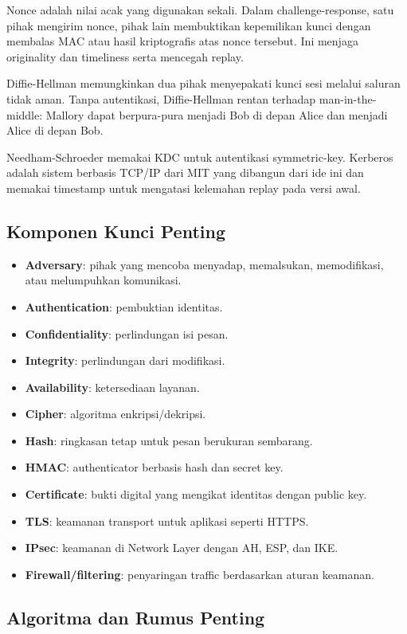 Nonce adalah nilai acak yang digunakan sekali. Dalam challenge-response, satu pihak mengirim nonce, pihak lain membuktikan kepemilikan kunci dengan membalas MAC atau hasil kriptografis atas nonce tersebut. Ini menjaga originality dan timeliness serta mencegah replay.

Diffie-Hellman memungkinkan dua pihak menyepakati kunci sesi melalui saluran tidak aman. Tanpa autentikasi, Diffie-Hellman rentan terhadap man-in-the-middle: Mallory dapat berpura-pura menjadi Bob di depan Alice dan menjadi Alice di depan Bob.

Needham-Schroeder memakai KDC untuk autentikasi symmetric-key. Kerberos adalah sistem berbasis TCP/IP dari MIT yang dibangun dari ide ini dan memakai timestamp untuk mengatasi kelemahan replay pada versi awal.

\subsection{Komponen Kunci Penting}

\begin{itemize}
    \item \textbf{Adversary}: pihak yang mencoba menyadap, memalsukan, memodifikasi, atau melumpuhkan komunikasi.
    \item \textbf{Authentication}: pembuktian identitas.
    \item \textbf{Confidentiality}: perlindungan isi pesan.
    \item \textbf{Integrity}: perlindungan dari modifikasi.
    \item \textbf{Availability}: ketersediaan layanan.
    \item \textbf{Cipher}: algoritma enkripsi/dekripsi.
    \item \textbf{Hash}: ringkasan tetap untuk pesan berukuran sembarang.
    \item \textbf{HMAC}: authenticator berbasis hash dan secret key.
    \item \textbf{Certificate}: bukti digital yang mengikat identitas dengan public key.
    \item \textbf{TLS}: keamanan transport untuk aplikasi seperti HTTPS.
    \item \textbf{IPsec}: keamanan di Network Layer dengan AH, ESP, dan IKE.
    \item \textbf{Firewall/filtering}: penyaringan traffic berdasarkan aturan keamanan.
\end{itemize}

\subsection{Algoritma dan Rumus Penting}

